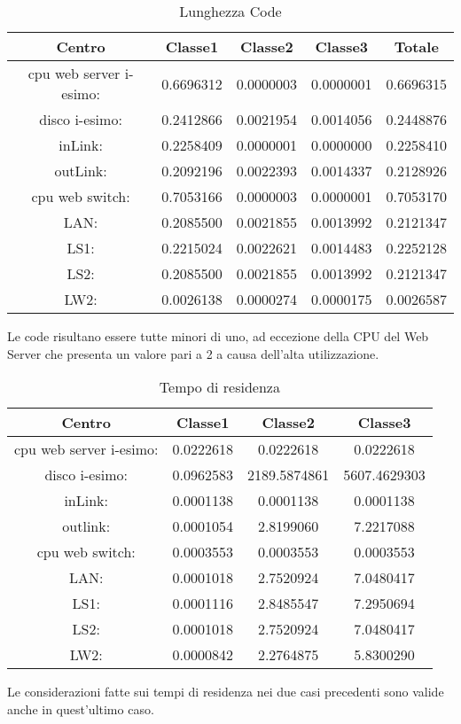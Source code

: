 \begin{table}[H]
\begin{center}
\begin{tabular}{||c|c|c|c|c||}
\hline
Centro &Classe1 &Classe2 &Classe3 &Totale\\
\hline
\hline
 cpu web server i-esimo: 	&0.6696312	&0.0000003	&0.0000001	&0.6696315	\\\hline
 disco i-esimo: 	&0.2412866	&0.0021954	&0.0014056	&0.2448876	\\\hline
 inLink: 	&0.2258409	&0.0000001	&0.0000000	&0.2258410	\\\hline
 outLink: 	&0.2092196	&0.0022393	&0.0014337	&0.2128926	\\\hline
 cpu web switch: 	&0.7053166	&0.0000003	&0.0000001	&0.7053170	\\\hline
 LAN: 	&0.2085500	&0.0021855	&0.0013992	&0.2121347	\\\hline
 LS1: 	&0.2215024	&0.0022621	&0.0014483	&0.2252128	\\\hline
 LS2: 	&0.2085500	&0.0021855	&0.0013992	&0.2121347	\\\hline
 LW2: 	&0.0026138	&0.0000274	&0.0000175	&0.0026587	\\\hline
\end{tabular}
\end{center}
\caption{Lunghezza Code}
\label{lunghezzacode}
\end{table}
Le code risultano essere tutte minori di uno, ad eccezione della CPU del Web Server che presenta un valore pari a 2 a causa dell'alta utilizzazione.
\begin{table}[H]
\begin{center}
\begin{tabular}{||c|c|c|c||}
\hline
Centro &Classe1 &Classe2 &Classe3\\
\hline
\hline
 cpu web server i-esimo: 	&0.0222618	&0.0222618	&0.0222618	\\\hline
 disco i-esimo: 	&0.0962583	&2189.5874861	&5607.4629303	\\\hline
 inLink: 	&0.0001138	&0.0001138	&0.0001138	\\\hline
 outlink: 	&0.0001054	&2.8199060	&7.2217088	\\\hline
 cpu web switch: 	&0.0003553	&0.0003553	&0.0003553	\\\hline
 LAN: 	&0.0001018	&2.7520924	&7.0480417	\\\hline
 LS1: 	&0.0001116	&2.8485547	&7.2950694	\\\hline
 LS2: 	&0.0001018	&2.7520924	&7.0480417	\\\hline
 LW2: 	&0.0000842	&2.2764875	&5.8300290	\\\hline
\end{tabular}
\end{center}
\caption{Tempo di residenza}
\label{tempodiresidenza}
\end{table}
Le considerazioni fatte sui tempi di residenza nei due casi precedenti sono valide anche in quest'ultimo caso. 
